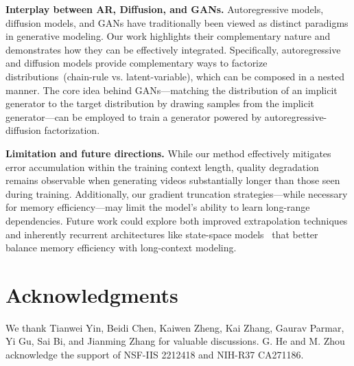 \documentclass{article}
\begin{document}
\noindent\textbf{Interplay between AR, Diffusion, and GANs.}
Autoregressive models, diffusion models, and GANs have traditionally been viewed as distinct paradigms in generative modeling. Our work highlights their complementary nature and demonstrates how they can be effectively integrated. Specifically, autoregressive and diffusion models provide complementary ways to factorize distributions~(chain-rule vs. latent-variable), which can be composed in a nested manner. The core idea behind GANs—matching the distribution of an implicit generator to the target distribution by drawing samples from the implicit generator—can be employed to train a generator powered by autoregressive-diffusion factorization.

\noindent\textbf{Limitation and future directions.}
While our method effectively mitigates error accumulation within the training context length, quality degradation remains observable when generating videos substantially longer than those seen during training. Additionally, our gradient truncation strategies—while necessary for memory efficiency—may limit the model's ability to learn long-range dependencies. Future work could explore both improved extrapolation techniques and inherently recurrent architectures like state-space models~\cite{gumamba,causalmamba} that better balance memory efficiency with long-context modeling.

\section*{Acknowledgments}
We thank Tianwei Yin, Beidi Chen, Kaiwen Zheng, Kai Zhang, Gaurav Parmar, Yi Gu, Sai Bi, and Jianming Zhang for valuable discussions. G. He and M. Zhou acknowledge the support of NSF-IIS 2212418 and NIH-R37
CA271186.
 


\end{document}
